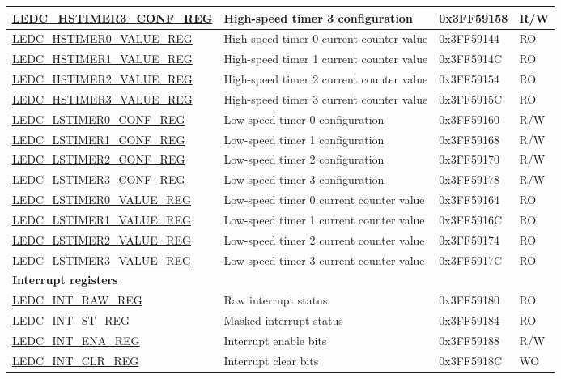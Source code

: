 \begin{longtable}{ | p{4.7cm} | p{7.3cm} | p{2cm} | p{1cm} | }
\hyperref[regdesc:LEDCHSTIMERnCONFREG]{LEDC\_HSTIMER3\_CONF\_REG} & High-speed timer 3 configuration & 0x3FF59158 & R/W \\\hline
\hyperref[regdesc:LEDCHSTIMERnVALUEREG]{LEDC\_HSTIMER0\_VALUE\_REG} & High-speed timer 0 current counter value & 0x3FF59144 & RO \\\hline
\hyperref[regdesc:LEDCHSTIMERnVALUEREG]{LEDC\_HSTIMER1\_VALUE\_REG} & High-speed timer 1 current counter value & 0x3FF5914C & RO \\\hline
\hyperref[regdesc:LEDCHSTIMERnVALUEREG]{LEDC\_HSTIMER2\_VALUE\_REG} & High-speed timer 2 current counter value & 0x3FF59154 & RO \\\hline
\hyperref[regdesc:LEDCHSTIMERnVALUEREG]{LEDC\_HSTIMER3\_VALUE\_REG} & High-speed timer 3 current counter value & 0x3FF5915C & RO \\\hline
\hyperref[regdesc:LEDCHSTIMERnCONFREG]{LEDC\_LSTIMER0\_CONF\_REG} & Low-speed timer 0 configuration & 0x3FF59160 & R/W \\\hline
\hyperref[regdesc:LEDCHSTIMERnCONFREG]{LEDC\_LSTIMER1\_CONF\_REG} & Low-speed timer 1 configuration & 0x3FF59168 & R/W \\\hline
\hyperref[regdesc:LEDCHSTIMERnCONFREG]{LEDC\_LSTIMER2\_CONF\_REG} & Low-speed timer 2 configuration & 0x3FF59170 & R/W \\\hline
\hyperref[regdesc:LEDCHSTIMERnCONFREG]{LEDC\_LSTIMER3\_CONF\_REG} & Low-speed timer 3 configuration & 0x3FF59178 & R/W \\\hline
\hyperref[regdesc:LEDCHSTIMERnVALUEREG]{LEDC\_LSTIMER0\_VALUE\_REG} & Low-speed timer 0 current counter value & 0x3FF59164 & RO \\\hline
\hyperref[regdesc:LEDCHSTIMERnVALUEREG]{LEDC\_LSTIMER1\_VALUE\_REG} & Low-speed timer 1 current counter value & 0x3FF5916C & RO \\\hline
\hyperref[regdesc:LEDCHSTIMERnVALUEREG]{LEDC\_LSTIMER2\_VALUE\_REG} & Low-speed timer 2 current counter value & 0x3FF59174 & RO \\\hline
\hyperref[regdesc:LEDCHSTIMERnVALUEREG]{LEDC\_LSTIMER3\_VALUE\_REG} & Low-speed timer 3 current counter value & 0x3FF5917C & RO \\\hline
\multicolumn{4}{|l|}{\textbf{Interrupt registers}} \\\hline
\hyperref[regdesc:LEDCINTRAWREG]{LEDC\_INT\_RAW\_REG} & Raw interrupt status & 0x3FF59180 & RO \\\hline
\hyperref[regdesc:LEDCINTSTREG]{LEDC\_INT\_ST\_REG} & Masked interrupt status & 0x3FF59184 & RO \\\hline
\hyperref[regdesc:LEDCINTENAREG]{LEDC\_INT\_ENA\_REG} & Interrupt enable bits & 0x3FF59188 & R/W \\\hline
\hyperref[regdesc:LEDCINTCLRREG]{LEDC\_INT\_CLR\_REG} & Interrupt clear bits & 0x3FF5918C & WO \\\hline
\end{longtable}
